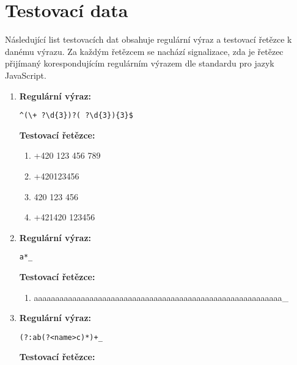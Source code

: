 \documentclass[czech,bachelor]{diploma}
\begin{document}
\chapter{Testovací data}\label{sec:TestingData}

Následující list testovacích dat obsahuje regulární výraz a testovací řetězce k danému výrazu.
Za každým řetězcem se nachází signalizace, zda je řetězec přijímaný korespondujícím regulárním výrazem dle standardu pro jazyk JavaScript.

\begin{enumerate}
    \item
    \noindent\textbf{Regulární výraz:}

    \texttt{\textasciicircum (\textbackslash + ?\textbackslash d\{3\})?( ?\textbackslash d\{3\})\{3\}\$}

    \noindent\textbf{Testovací řetězce:}

    \begin{enumerate}
        \item +420 123 456 789 \setlength\parindent{1em} \textcolor{OliveGreen}{\Checkmark} \label{itm:TD_1a}
        \item +420123456 \setlength\parindent{1em} \textcolor{Red}{\XSolid} \label{itm:TD_1b}
        \item 420 123 456 \setlength\parindent{1em} \textcolor{OliveGreen}{\Checkmark} \label{itm:TD_1c}
        \item +421420 123456 \setlength\parindent{1em} \textcolor{OliveGreen}{\Checkmark} \label{itm:TD_1d}
    \end{enumerate}


    \item
    \noindent\textbf{Regulární výraz:} 

    \texttt{a*\_}

    \noindent\textbf{Testovací řetězce:}

    \begin{enumerate}
        \item aaaaaaaaaaaaaaaaaaaaaaaaaaaaaaaaaaaaaaaaaaaaaaaaaaaaaaaaaa\_ \setlength\parindent{1em} \textcolor{OliveGreen}{\Checkmark} \label{itm:TD_2a}
    \end{enumerate}


    \item 
    \noindent\textbf{Regulární výraz:} 

    \texttt{(?:ab(?<name>c)*)+\_}

    \noindent\textbf{Testovací řetězce:}


\end{enumerate}
\end{document}
